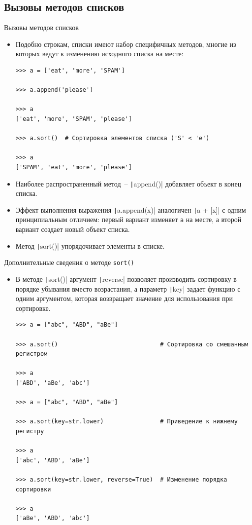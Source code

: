 \documentclass[aspectratio=169, mathserif]{beamer}%
\begin{document}
\subsection{Вызовы методов списков}

\begin{frame}[fragile]{Вызовы методов списков}
\scriptsize
\begin{itemize}
\item Подобно строкам, списки имеют набор специфичных методов, многие из которых ведут к изменению исходного списка на месте:
\begin{verbatim}
>>> a = ['eat', 'more', 'SPAM']

>>> a.append('please')

>>> a
['eat', 'more', 'SPAM', 'please']

>>> a.sort()  # Сортировка элементов списка ('S' < 'e')
   
>>> a
['SPAM', 'eat', 'more', 'please']
\end{verbatim}
\item Наиболее распространенный метод~-- \texttt|append()| добавляет объект в конец списка. 
\item Эффект выполнения выражения \texttt|a.append(x)| аналогичен \texttt|a + [x]| с одним принципиальным отличием: первый вариант изменяет \texttt{a} на месте, а второй вариант создает новый объект списка. 
\item Метод \texttt|sort()| упорядочивает элементы в списке.
\end{itemize}
\vfill
\end{frame}

\begin{frame}[fragile]{Дополнительные сведения о методе \texttt{sort()}}
\scriptsize
\begin{itemize}
	\item В методе \texttt|sort()| аргумент \texttt|reverse| позволяет производить сортировку в порядке убывания вместо возрастания, а параметр \texttt|key| задает функцию с одним аргументом, которая возвращает значение для использования при сортировке.
\begin{verbatim}
>>> a = ["abc", "ABD", "aBe"]   

>>> a.sort()                             # Сортировка со смешанным регистром

>>> a
['ABD', 'aBe', 'abc']

>>> a = ["abc", "ABD", "aBe"]

>>> a.sort(key=str.lower)                # Приведение к нижнему регистру

>>> a
['abc', 'ABD', 'aBe']

>>> a.sort(key=str.lower, reverse=True)  # Изменение порядка сортировки

>>> a
['aBe', 'ABD', 'abc']
\end{verbatim}
\end{itemize}
\vfill
\end{frame}
\end{document}
